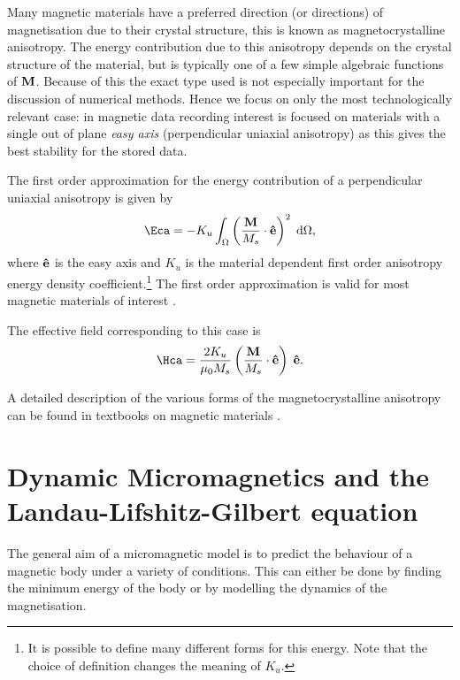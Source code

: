 Many magnetic materials have a preferred direction (or directions) of magnetisation due to their crystal structure, this is known as magnetocrystalline anisotropy.
The energy contribution due to this anisotropy depends on the crystal structure of the material, but is typically one of a few simple algebraic functions of $\mathbf{M}$.
Because of this the exact type used is not especially important for the discussion of numerical methods.
Hence we focus on only the most technologically relevant case: in magnetic data recording interest is focused on materials with a single out of plane \emph{easy axis} (perpendicular uniaxial anisotropy) as this gives the best stability for the stored data.

The first order approximation for the energy contribution of a perpendicular uniaxial anisotropy is given by
\begin{equation}
  \Eca = -K_u \int_\magd \left( \frac{\Mv}{M_s} \cdot \ev \right)^2 \d \magd,
  \label{eq:36}
\end{equation}
where $\mathbf{\hat{e}}$ is the easy axis and $K_u$ is the material dependent first order anisotropy energy density coefficient.\footnote{It is possible to define many different forms for this energy. Note that the choice of definition changes the meaning of $K_u$.}
The first order approximation is valid for most magnetic materials of interest \cite{Kronmuller2003}.

The effective field corresponding to this case is
\begin{equation}
  \Hca = \frac{2 K_u}{\mu_0 M_s} \left( \frac{\Mv}{M_s} \cdot \ev \right) \; \ev.
  \label{eq:Hca}
\end{equation}

A detailed description of the various forms of the magnetocrystalline anisotropy can be found in textbooks on magnetic materials \cite{Coey2010} \cite{Aharoni1996}.



\section{Dynamic Micromagnetics and the Landau-Lifshitz-Gilbert equation}
\label{sec:land-lifsch-gilb}

The general aim of a micromagnetic model is to predict the behaviour of a magnetic body under a variety of conditions.
This can either be done by finding the minimum energy of the body or by modelling the dynamics of the magnetisation.

